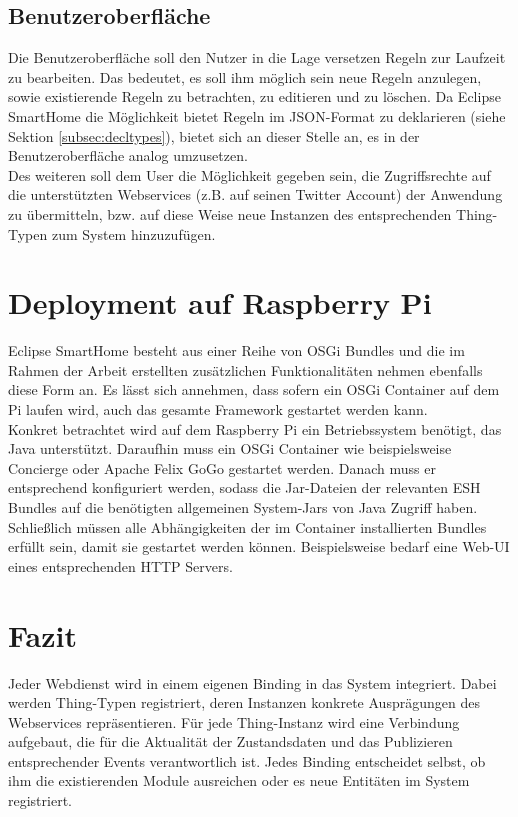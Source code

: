 \subsection{Benutzeroberfläche}
Die Benutzeroberfläche soll den Nutzer in die Lage versetzen Regeln zur Laufzeit zu bearbeiten. Das bedeutet, es soll ihm möglich sein neue Regeln anzulegen, sowie existierende Regeln zu betrachten, zu editieren und zu löschen. Da Eclipse SmartHome die Möglichkeit bietet Regeln im JSON-Format zu deklarieren (siehe Sektion \ref{subsec:decltypes}), bietet sich an dieser Stelle an, es in der Benutzeroberfläche analog umzusetzen.\\

Des weiteren soll dem User die Möglichkeit gegeben sein, die Zugriffsrechte auf die unterstützten Webservices (z.B. auf seinen Twitter Account) der Anwendung zu übermitteln, bzw. auf diese Weise neue Instanzen des entsprechenden Thing-Typen zum System hinzuzufügen.




\section{Deployment auf Raspberry Pi}
\label{sec:deploy}
Eclipse SmartHome besteht aus einer Reihe von OSGi Bundles und die im Rahmen der Arbeit erstellten zusätzlichen Funktionalitäten nehmen ebenfalls diese Form an. Es lässt sich annehmen, dass sofern ein OSGi Container auf dem Pi laufen wird, auch das gesamte Framework gestartet werden kann.\\

Konkret betrachtet wird auf dem Raspberry Pi ein Betriebssystem benötigt, das Java unterstützt. Daraufhin muss ein OSGi Container wie beispielsweise Concierge oder Apache Felix GoGo gestartet werden. Danach muss er entsprechend konfiguriert werden, sodass die Jar-Dateien der relevanten ESH Bundles auf die benötigten allgemeinen System-Jars von Java Zugriff haben. Schließlich müssen alle Abhängigkeiten der im Container installierten Bundles erfüllt sein, damit sie gestartet werden können. Beispielsweise bedarf eine Web-UI eines entsprechenden HTTP Servers.


\section{Fazit}
Jeder Webdienst wird in einem eigenen Binding in das System integriert. Dabei werden Thing-Typen registriert, deren Instanzen konkrete Ausprägungen des Webservices repräsentieren. Für jede Thing-Instanz wird eine Verbindung aufgebaut, die für die Aktualität der Zustandsdaten und das Publizieren entsprechender Events verantwortlich ist. Jedes Binding entscheidet selbst, ob ihm die existierenden Module ausreichen oder es neue Entitäten im System registriert. 






